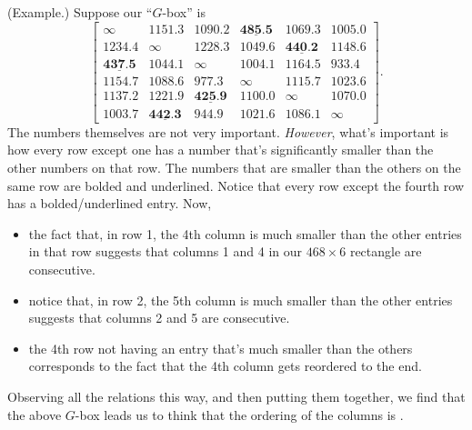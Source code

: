 \documentclass[letterpaper]{article}
\begin{document}
\begin{mdframed}
    (Example.) Suppose our ``$G$-box'' is 
    \[\begin{bmatrix}
        \infty & 1151.3 & 1090.2 & \underline{\textbf{485.5}} & 1069.3 & 1005.0 \\ 
        1234.4 & \infty & 1228.3 & 1049.6 & \underline{\textbf{440.2}} & 1148.6 \\ 
        \underline{\textbf{437.5}} & 1044.1 & \infty & 1004.1 & 1164.5 & 933.4 \\ 
        1154.7 & 1088.6 & 977.3 & \infty & 1115.7 & 1023.6 \\ 
        1137.2 & 1221.9 & \underline{\textbf{425.9}} & 1100.0 & \infty & 1070.0 \\ 
        1003.7 & \underline{\textbf{442.3}} & 944.9 & 1021.6 & 1086.1 & \infty
    \end{bmatrix}.\]
    The numbers themselves are not very important. \emph{However}, what's important is how every row except one has a number that's significantly smaller than the other numbers on that row. The numbers that are smaller than the others on the same row are bolded and underlined. Notice that every row except the fourth row has a bolded/underlined entry. Now, 
    \begin{itemize}
        \item the fact that, in row 1, the 4th column is much smaller than the other entries in that row suggests that columns 1 and 4 in our $468 \times 6$ rectangle are consecutive.
        \item notice that, in row 2, the 5th column is much smaller than the other entries suggests that columns 2 and 5 are consecutive.
        \item the 4th row not having an entry that's much smaller than the others corresponds to the fact that the 4th column gets reordered to the end. 
    \end{itemize} 
    Observing all the relations this way, and then putting them together, we find that the above $G$-box leads us to think that the ordering of the columns is .

    \bigskip 


\end{mdframed}
\end{document}

